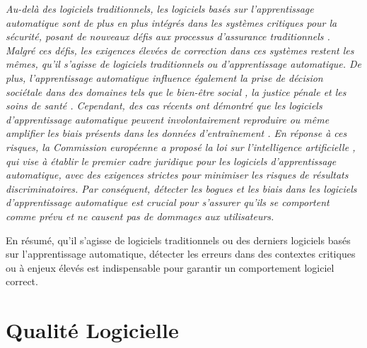 {\em
Au-delà des logiciels traditionnels, les logiciels basés sur l'apprentissage automatique sont de plus en plus intégrés dans les systèmes critiques pour la sécurité, posant de nouveaux défis aux processus d'assurance traditionnels . Malgré ces défis, les exigences élevées de correction dans ces systèmes restent les mêmes, qu'il s'agisse de logiciels traditionnels ou d'apprentissage automatique. De plus, l'apprentissage automatique influence également la prise de décision sociétale dans des domaines tels que le bien-être social , la justice pénale  et les soins de santé . Cependant, des cas récents ont démontré que les logiciels d'apprentissage automatique peuvent involontairement reproduire ou même amplifier les biais présents dans les données d'entraînement \cite{Buolamwini2018,Kay2015,Larson2016,Obermeyer2019}. En réponse à ces risques, la Commission européenne a proposé la loi sur l'intelligence artificielle , qui vise à établir le premier cadre juridique pour les logiciels d'apprentissage automatique, avec des exigences strictes pour minimiser les risques de résultats discriminatoires. Par conséquent, détecter les bogues et les biais dans les logiciels d'apprentissage automatique est crucial pour s'assurer qu'ils se comportent comme prévu et ne causent pas de dommages aux utilisateurs.

En résumé, qu'il s'agisse de logiciels traditionnels ou des derniers logiciels basés sur l'apprentissage automatique, détecter les erreurs dans des contextes critiques ou à enjeux élevés est indispensable pour garantir un comportement logiciel correct.
}

\section*{Qualité Logicielle}


